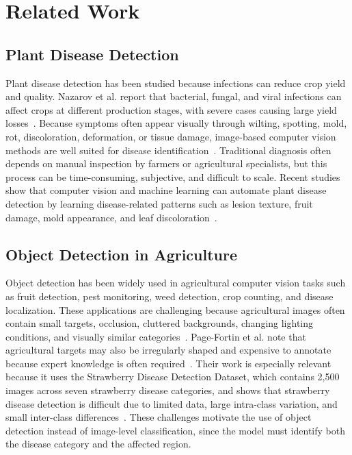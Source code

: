 \documentclass[10pt,twocolumn,letterpaper]{article}
\begin{document}
\section{Related Work}
\label{sec:related}

\subsection{Plant Disease Detection}

Plant disease detection has been studied because infections can reduce crop yield and quality. Nazarov et al. report that bacterial, fungal, and viral infections can affect crops at different production stages, with severe cases causing large yield losses~\cite{nazarov2020infectious}. Because symptoms often appear visually through wilting, spotting, mold, rot, discoloration, deformation, or tissue damage, image-based computer vision methods are well suited for disease identification~\cite{nazarov2020infectious}. Traditional diagnosis often depends on manual inspection by farmers or agricultural specialists, but this process can be time-consuming, subjective, and difficult to scale. Recent studies show that computer vision and machine learning can automate plant disease detection by learning disease-related patterns such as lesion texture, fruit damage, mold appearance, and leaf discoloration~\cite{raja2025realtime,upadhyay2025deep}.

\subsection{Object Detection in Agriculture}

Object detection has been widely used in agricultural computer vision tasks such as fruit detection, pest monitoring, weed detection, crop counting, and disease localization. These applications are challenging because agricultural images often contain small targets, occlusion, cluttered backgrounds, changing lighting conditions, and visually similar categories~\cite{upadhyay2025deep}. Page-Fortin et al. note that agricultural targets may also be irregularly shaped and expensive to annotate because expert knowledge is often required~\cite{pagefortin2023class}. Their work is especially relevant because it uses the Strawberry Disease Detection Dataset, which contains 2,500 images across seven strawberry disease categories, and shows that strawberry disease detection is difficult due to limited data, large intra-class variation, and small inter-class differences~\cite{pagefortin2023class}. These challenges motivate the use of object detection instead of image-level classification, since the model must identify both the disease category and the affected region.
\end{document}
